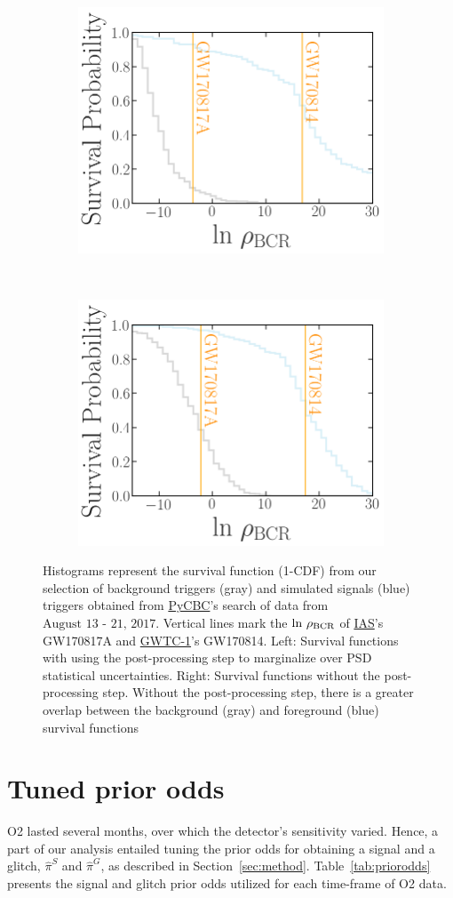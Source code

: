 \documentclass[%
 nofootinbib,
 amsmath,amssymb,
 aps,
 twocolumn,
 superscriptaddress
]{revtex4-2}
\newcommand{\pycbc}{{\sc \href{https://pycbc.org/}{{PyCBC}}}\xspace}
\newcommand{\GWTC}{{\sc \href{https://ui.adsabs.harvard.edu/abs/2019PhRvX...9c1040A/abstract}{{GWTC-1}}}\xspace}
\newcommand{\IAS}{{\sc \href{https://ui.adsabs.harvard.edu/abs/2020PhRvD.101h3030V/abstract}{{IAS}}}\xspace}
\newcommand{\mathcmd}[1]{{\sc \relax\ifmmode#1\else $#1$\fi}\xspace}
\newcommand{\bcr}{\mathcmd{\rho_\text{BCR}}}
\begin{document}
\begin{figure}
    \centering
    \begin{subfigure}
        \centering
        \includegraphics[width=0.45\linewidth]{reweighted_bcr_cdf_smaller_legend.png}
    \end{subfigure}
    ~ 
    \begin{subfigure}
        \centering
        \includegraphics[width=0.45\linewidth]{orig_bcr_cdf_smaller_legend.png}
    \end{subfigure}
    \caption{
    Histograms represent the survival function (1-CDF) from our selection of background triggers (gray) and simulated signals (blue) triggers obtained from \pycbc's search of data from $\text{August 13 - 21, 2017}$. Vertical lines mark the $\text{ln}\ \bcr$ of \IAS's GW170817A and \GWTC's GW170814.
    Left: Survival functions with using the post-processing step to marginalize over PSD statistical uncertainties. Right: Survival functions without the post-processing step. Without the post-processing step, there is a greater overlap between the background (gray) and foreground (blue) survival functions
    \label{fig:bcrCdf}}
\end{figure}






\section{Tuned prior odds}\label{apdx:alphabeta}

O2 lasted several months, over which the detector's sensitivity varied. Hence, a part of our analysis entailed tuning the prior odds for obtaining a signal and a glitch, $\hat{\pi}^S$ and $\hat{\pi}^G$, as described in Section~\ref{sec:method}. Table~\ref{tab:priorodds} presents the signal and glitch prior odds utilized for each time-frame of O2 data. 

\end{document}

